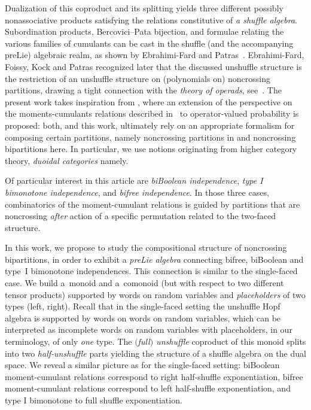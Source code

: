 \documentclass[pdftex]{sigma}
\numberwithin{equation}{section}
\begin{document}
 Dualization of this coproduct and its splitting yields three different possibly nonassociative products satisfying the relations constitutive of \emph{a shuffle algebra}.
Subordination products, Bercovici--Pata bijection, and formulae relating the various families of cumulants can be cast in the shuffle (and the accompanying preLie) algebraic realm, as shown by Ebrahimi-Fard and Patras~\cite{EbrahimiFardPatras2019applications}.
Ebrahimi-Fard, Foissy, Kock and Patras recognized later that the discussed unshuffle structure is the restriction of an unshuffle structure on (polynomials on) noncrossing partitions, drawing a tight connection with the \emph{theory of operads}, see~\cite{ebrahimi2020operads}.
The present work takes inspiration from \cite{ebrahimi2020operads}, where an extension of the perspective on the moments-cumulants relations described in~\cite{ebrahimi2015cumulants} to operator-valued probability is proposed: both, \cite{ebrahimi2020operads} and this work, ultimately rely on an appropriate formalism for composing certain partitions, namely noncrossing partitions in \cite{ebrahimi2020operads} and noncrossing bipartitions here.
In particular, we use notions originating from higher category theory, \emph{duoidal categories} namely.

Of particular interest in this article are \emph{biBoolean independence}, \emph{type I bimonotone independence}, and \emph{bifree independence}. In those three cases, combinatorics of the moment-cumulant relations is guided by partitions that are noncrossing \emph{after} action of a specific permutation related to the two-faced structure.

In this work, we propose to study the
compositional structure of noncrossing bipartitions,
in order to exhibit a \emph{preLie algebra} connecting bifree, biBoolean and type~I bimonotone independences. This connection is similar to the single-faced case.
We build a~monoid and a~comonoid (but with respect to two different tensor products) supported by words on random variables and \emph{placeholders} of two types (left, right).
Recall that in the single-faced setting the unshuffle Hopf algebra is supported by words on words on random variables, which can be interpreted as incomplete words on random variables with placeholders, in our terminology, of only \emph{one} type.
The \emph{$($full$)$ unshuffle} coproduct of this monoid splits into two \emph{half-unshuffle} parts yielding the structure of a shuffle algebra on the dual space. We reveal a similar picture as for the single-faced setting: biBoolean moment-cumulant relations correspond to right half-shuffle exponentiation, bifree moment-cumulant relations correspond to left half-shuffle exponentiation, and type I bimonotone to full shuffle exponentiation.
\end{document}
